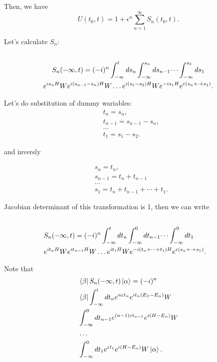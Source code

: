 \documentclass[main.tex]{subfiles}
\begin{document}
Then, we have
\begin{equation}
U(t_0, t) = 1 + \epsilon^n \sum_{n=1}^\infty S_n (t_0, t).
\end{equation}

Let's calculate $S_n$:
\begin{multline}\\
S_n(-\infty, t) = (-i)^n \int_{-\infty}^t ds_n \int_{-\infty}^{s_n} ds_{n - 1}\dots \int_{-\infty}^{s_2} ds_1\\
e^{is_nH}We^{i(s_{n-1} - s_n)H}W \dots e^{i(s_1 - s_2)H}We^{-is_1H}e^{\eepsilon(s_n + \cdot + s_1)}.
\end{multline}

Let's do substitution of dummy wariables:
\begin{align*}
&t_n = s_n,\\
&t_{n-1} = s_{n-1} - s_n,\\
&\dots\\
&t_1 = s_1 - s_2.
\end{align*} 

and inversly

\begin{align*}
&s_n =t_n,\\
&s_{n-1} = t_n + t_{n-1}\\
&\dots\\
&s_1 = t_n + t_{n-1} + \cdots + t_1.
\end{align*}

Jacobian determinant of this transformation is 1, then we can write
\begin{align*}\\
&S_n(-\infty, t) = (-i)^n \int_{-\infty}^t dt_n \int_{-\infty}^{0} dt_{n - 1}\dots \int_{-\infty}^{0} dt_1\\
&e^{it_nH}We^{it_{n-1}H}W \dots e^{it_1H}We^{-i(t_n + \cdots + t_1)H}e^{\eepsilon(s_n + \cdot + s_1)}.
\end{align*}

Note that
\begin{align*}
&\bra{\beta}S_n (-\infty, t) \ket{\alpha} = (-i)^n \\
& \bra{\beta} \int^t_{-\infty} dt_n e^{n\eepsilon t_{n}} e^{it_n(E_{\beta} - E_{\alpha})} W\\
& \int^0_{-\infty}dt_{n-1} e^{(n - 1)\eepsilon t_{n - 1}}e^{i(H - E_\alpha)} W\\
& \dots \\
&\int^0_{-\infty}dt_{1} e^{\eepsilon t_1}e^{i(H - E_\alpha)} W \ket{\alpha}.
\end{align*} 
\end{document}
